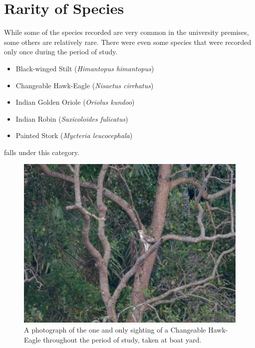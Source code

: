 \section{Rarity of Species}
While some of the species recorded are very common in the university premises, some others are relatively rare. There were even some species that were recorded only once during the period of study.
\begin{itemize}
    \item Black-winged Stilt (\textit{Himantopus himantopus})
    \item Changeable Hawk-Eagle (\textit{Nisaetus cirrhatus})
    \item Indian Golden Oriole (\textit{Oriolus kundoo})
    \item Indian Robin (\textit{Saxicoloides fulicatus})
    \item Painted Stork (\textit{Mycteria leucocephala})
    
\end{itemize}
falls under this category.
\begin{figure}[!htpb]
    \centering
    \includegraphics[width=\linewidth]{Figures/crested-hawk.jpg}
    \caption[]{A photograph of the one and only sighting of a Changeable Hawk-Eagle throughout the period of study, taken at boat yard.}
    \label{fig:figure-01}
\end{figure}

